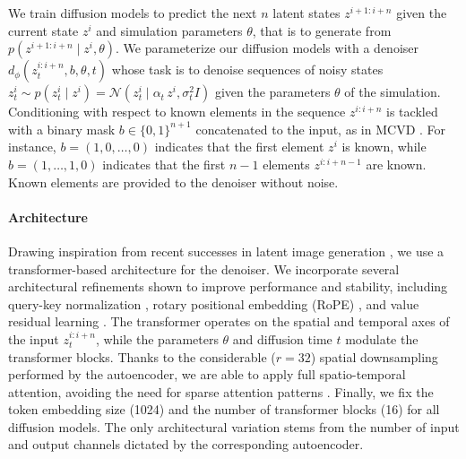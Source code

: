 We train diffusion models to predict the next $n$ latent states $z^{i+1:i+n}$ given the current state $z^i$ and simulation parameters $\theta$, that is to generate from $p(z^{i+1:i+n} \mid z^i, \theta)$. We parameterize our diffusion models with a denoiser $d_\phi(z_t^{i:i+n}, b, \theta, t)$ whose task is to denoise sequences of noisy states $z_t^{i} \sim p(z_t^{i} \mid z^{i}) = \mathcal{N}(z_t^{i} \mid \alpha_t \, z^{i}, \sigma_t^2 I)$ given the parameters $\theta$ of the simulation. Conditioning with respect to known elements in the sequence $z^{i:i+n}$ is tackled with a binary mask $b \in \{0, 1\}^{n+1}$ concatenated to the input, as in MCVD \cite{voleti2022mcvd}. For instance, $b = (1, 0, \dots, 0)$ indicates that the first element $z^i$ is known, while $b = (1, \dots, 1, 0)$ indicates that the first $n - 1$ elements $z^{i:i+n-1}$ are known. Known elements are provided to the denoiser without noise.

\paragraph{Architecture} Drawing inspiration from recent successes in latent image generation \cite{peebles2023scalable, karras2024analyzing, esser2024scaling, xie2025sana, chen2025deep}, we use a transformer-based architecture for the denoiser. We incorporate several architectural refinements shown to improve performance and stability, including query-key normalization \cite{henry2020querykey}, rotary positional embedding (RoPE) \cite{su2024roformer, heo2025rotary}, and value residual learning \cite{zhou2024value}. The transformer operates on the spatial and temporal axes of the input $z_t^{i:i+n}$, while the parameters $\theta$ and diffusion time $t$ modulate the transformer blocks. Thanks to the considerable ($r = 32$) spatial downsampling performed by the autoencoder, we are able to apply full spatio-temporal attention, avoiding the need for sparse attention patterns \cite{huang2019ccnet, ho2019axial, hassani2023neighborhood}. Finally, we fix the token embedding size (1024) and the number of transformer blocks (16) for all diffusion models. The only architectural variation stems from the number of input and output channels dictated by the corresponding autoencoder.


